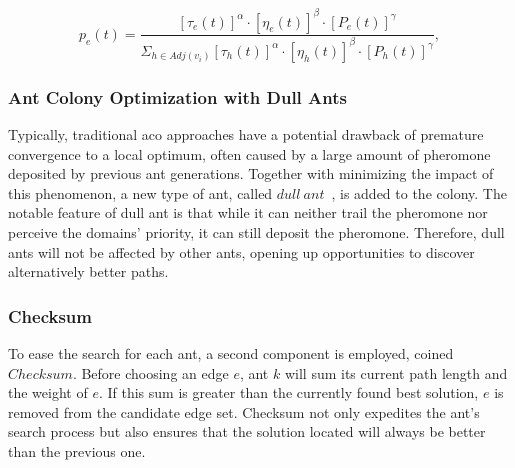 \begin{equation}
	\label{equation:edge_pick}
	p_e(t) = 
	\frac{[\tau_e(t)]^{\alpha} \cdot [\eta_e(t)]^{\beta} \cdot  [P_e(t)]^{\gamma}}{\Sigma_{h \in Adj(v_i)} [\tau_h(t)]^{\alpha} \cdot [\eta_h(t)]^{\beta} \cdot [P_h(t)]^{\gamma}},
\end{equation}

\subsubsection{Ant Colony Optimization with Dull Ants}
Typically, traditional \gls{aco} approaches have a potential drawback of premature convergence to a local optimum, often caused by a large amount of pheromone deposited by previous ant generations. Together with minimizing the impact of this phenomenon, a new type of ant, called $dull~ant$~\cite{shimomura2010ant}, is added to the colony. The notable feature of dull ant is that while it can neither trail the pheromone nor perceive the domains' priority, it can still deposit the pheromone. Therefore, dull ants will not be affected by other ants, opening up opportunities to discover alternatively better paths.

\subsubsection{Checksum}
To ease the search for each ant, a second component is employed, coined $Checksum$. Before choosing an edge $e$, ant $k$ will sum its current path length and the weight of $e$. If this sum is greater than the currently found best solution, $e$ is removed from the candidate edge set. Checksum not only expedites the ant's search process but also ensures that the solution located will always be better than the previous one.

